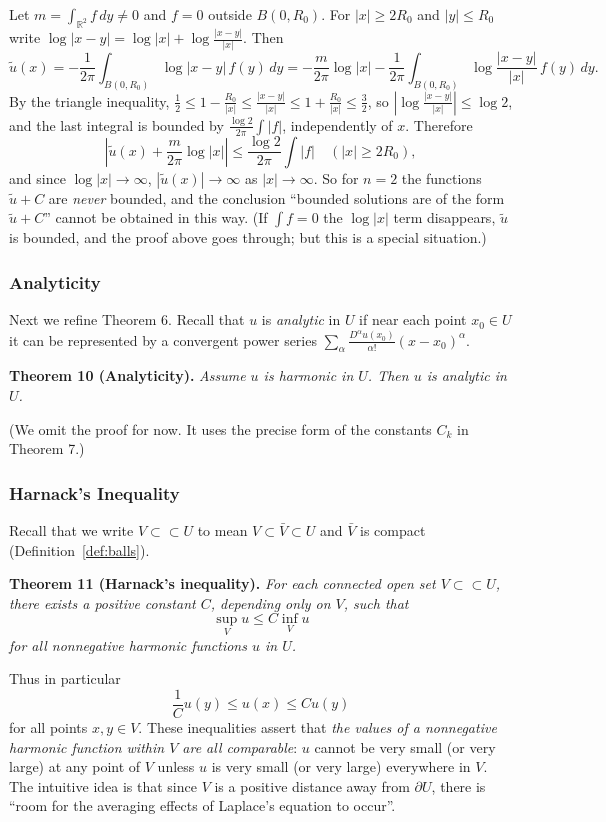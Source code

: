 \documentclass[11pt]{article}
\theoremstyle{plain}
\theoremstyle{definition}
\theoremstyle{remark}
\begin{document}
Let $m = \int_{\mathbb{R}^2}f\, dy \neq 0$ and $f = 0$ outside $B(0,R_0)$. For $|x| \geq 2R_0$ and $|y| \leq R_0$ write $\log|x - y| = \log|x| + \log\frac{|x-y|}{|x|}$. Then
$$ \tilde u(x) = -\frac{1}{2\pi}\int_{B(0,R_0)}\log|x-y|\, f(y)\, dy = -\frac{m}{2\pi}\log|x| - \frac{1}{2\pi}\int_{B(0,R_0)}\log\frac{|x-y|}{|x|}\, f(y)\, dy. $$
By the triangle inequality, $\frac12 \leq 1 - \frac{R_0}{|x|} \leq \frac{|x - y|}{|x|} \leq 1 + \frac{R_0}{|x|} \leq \frac32$, so $\left|\log\frac{|x-y|}{|x|}\right| \leq \log 2$, and the last integral is bounded by $\frac{\log 2}{2\pi}\int|f|$, independently of $x$. Therefore
$$ \left|\tilde u(x) + \frac{m}{2\pi}\log|x|\right| \leq \frac{\log 2}{2\pi}\int|f| \quad (|x| \geq 2R_0), $$
and since $\log|x| \to \infty$, $|\tilde u(x)| \to \infty$ as $|x| \to \infty$. So for $n = 2$ the functions $\tilde u + C$ are \emph{never} bounded, and the conclusion ``bounded solutions are of the form $\tilde u + C$'' cannot be obtained in this way. (If $\int f = 0$ the $\log|x|$ term disappears, $\tilde u$ is bounded, and the proof above goes through; but this is a special situation.)

\subsubsection{Analyticity}
Next we refine Theorem 6. Recall that $u$ is \emph{analytic} in $U$ if near each point $x_0 \in U$ it can be represented by a convergent power series $\sum_\alpha \frac{D^\alpha u(x_0)}{\alpha!}(x - x_0)^\alpha$.

\textbf{Theorem 10 (Analyticity).} \textit{Assume $u$ is harmonic in $U$. Then $u$ is analytic in $U$.}

(We omit the proof for now. It uses the precise form of the constants $C_k$ in Theorem 7.)

\subsubsection{Harnack's Inequality}
Recall that we write $V \subset\subset U$ to mean $V \subset \bar V \subset U$ and $\bar V$ is compact (Definition~\ref{def:balls}).

\textbf{Theorem 11 (Harnack's inequality).} \textit{For each connected open set $V \subset\subset U$, there exists a positive constant $C$, depending only on $V$, such that}
$$ \sup_V u \leq C\inf_V u $$
\textit{for all nonnegative harmonic functions $u$ in $U$.}

Thus in particular
$$ \frac1C u(y) \leq u(x) \leq Cu(y) $$
for all points $x, y \in V$. These inequalities assert that \emph{the values of a nonnegative harmonic function within $V$ are all comparable}: $u$ cannot be very small (or very large) at any point of $V$ unless $u$ is very small (or very large) everywhere in $V$. The intuitive idea is that since $V$ is a positive distance away from $\partial U$, there is ``room for the averaging effects of Laplace's equation to occur''.
\end{document}
